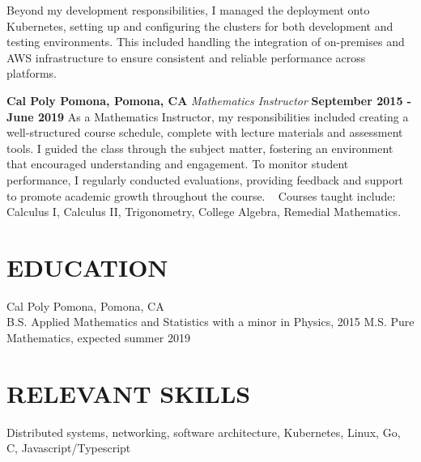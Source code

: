 \documentclass[margin]{./res}
\begin{document}
\begin{resume}
Beyond my development responsibilities, I managed the deployment onto Kubernetes, setting up and configuring the clusters for both development and testing environments. This included handling the integration of on-premises and AWS infrastructure to ensure consistent and reliable performance across platforms.

{\bf Cal Poly Pomona, Pomona, CA}\newline
{\it Mathematics Instructor}\newline
{\bf September 2015 - June 2019}\newline
As a Mathematics Instructor, my responsibilities included creating a well-structured course schedule, complete with lecture materials and assessment tools. I guided the class through the subject matter, fostering an environment that encouraged understanding and engagement. To monitor student performance, I regularly conducted evaluations, providing feedback and support to promote academic growth throughout the course.\newline
\ \newline
Courses taught include: Calculus I, Calculus II, Trigonometry, College Algebra,
Remedial Mathematics.

\section{EDUCATION}
Cal Poly Pomona, Pomona, CA \\
B.S. Applied Mathematics and Statistics with a minor in Physics, 2015 \newline
M.S. Pure Mathematics, expected summer 2019

\section{RELEVANT SKILLS}
Distributed systems, networking, software architecture, Kubernetes, Linux, Go, C, Javascript/Typescript
 
\end{resume}
\end{document}
